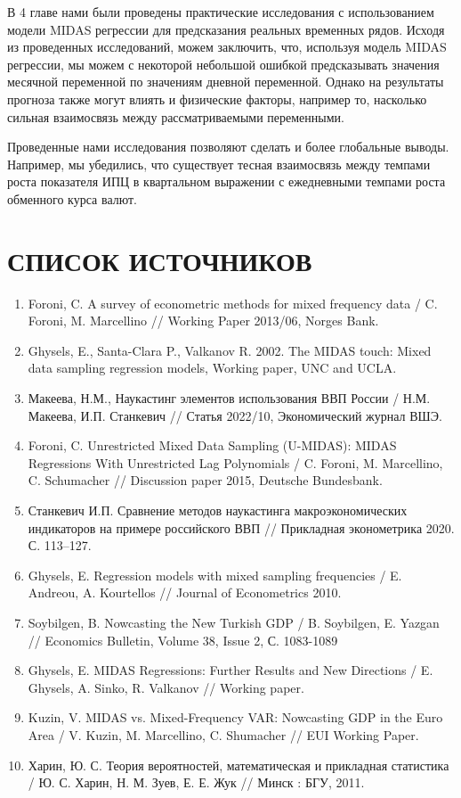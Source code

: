 \documentclass[a4paper, 12pt]{extarticle}
\begin{document}
	В 4 главе нами были проведены практические исследования с использованием модели MIDAS регрессии для предсказания реальных временных рядов. Исходя из проведенных исследований, можем заключить, что, используя модель MIDAS регрессии, мы можем с некоторой небольшой ошибкой предсказывать значения месячной переменной по значениям дневной переменной. Однако на результаты прогноза также могут влиять и физические факторы, например то, насколько сильная взаимосвязь между рассматриваемыми переменными.
	
	Проведенные нами исследования позволяют сделать и более глобальные выводы. Например, мы убедились, что существует тесная взаимосвязь между темпами роста показателя ИПЦ в квартальном выражении с ежедневными темпами роста обменного курса валют.
	\newpage
	\section{СПИСОК ИСТОЧНИКОВ}
	\begin{enumerate}
		\item Foroni, C. A survey of econometric methods for mixed frequency data / C. Foroni, M. Marcellino // Working Paper 2013/06, Norges Bank.
		\item Ghysels, E., Santa-Clara P., Valkanov R. 2002. The MIDAS touch: Mixed data sampling regression models, Working paper, UNC and UCLA.
		\item Макеева, Н.М., Наукастинг элементов использования ВВП России / Н.М. Макеева, И.П. Станкевич // Статья 2022/10, Экономический журнал ВШЭ.
		\item Foroni, C. Unrestricted Mixed Data Sampling (U-MIDAS): MIDAS Regressions With Unrestricted Lag Polynomials / C. Foroni, M. Marcellino, C. Schumacher // Discussion paper 2015, Deutsche Bundesbank.
		\item Станкевич И.П. Сравнение методов наукастинга макроэкономических индикаторов на примере российского ВВП // Прикладная эконометрика 2020. С. 113–127.
		\item Ghysels, E. Regression models with mixed sampling frequencies /  E. Andreou, A. Kourtellos // Journal of Econometrics 2010.
		\item Soybilgen, B. Nowcasting the New Turkish GDP / B. Soybilgen, E. Yazgan // Economics Bulletin, Volume 38, Issue 2, 
		С. 1083-1089
		\item Ghysels, E. MIDAS Regressions: Further Results and New Directions / E. Ghysels, A. Sinko, R. Valkanov // Working paper.
		\item Kuzin, V. MIDAS vs. Mixed-Frequency VAR:
		Nowcasting GDP in the Euro Area / V. Kuzin,
		M. Marcellino, C. Shumacher // EUI Working Paper.
		\item Харин, Ю. С. Теория вероятностей,
		математическая
		и прикладная статистика / Ю. С. Харин, Н. М. Зуев, Е. Е. Жук // Минск : БГУ, 2011. 
	\end{enumerate}
	\newpage
\end{document}
